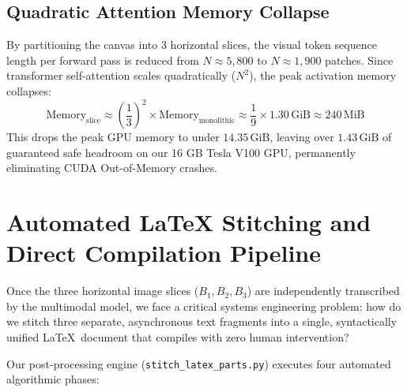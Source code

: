 \subsection{Quadratic Attention Memory Collapse}
By partitioning the canvas into 3 horizontal slices, the visual token sequence length per forward pass is reduced from $N \approx 5,800$ to $N \approx 1,900$ patches. Since transformer self-attention scales quadratically ($N^2$), the peak activation memory collapses:
\begin{equation}
\text{Memory}_{\text{slice}} \approx \left(\frac{1}{3}\right)^2 \times \text{Memory}_{\text{monolithic}} \approx \frac{1}{9} \times 1.30\,\text{GiB} \approx 240\,\text{MiB}
\end{equation}
This drops the peak GPU memory to under $14.35\,\text{GiB}$, leaving over $1.43\,\text{GiB}$ of guaranteed safe headroom on our 16 GB Tesla V100 GPU, permanently eliminating CUDA Out-of-Memory crashes.

\section{Automated LaTeX Stitching and Direct Compilation Pipeline}
\label{sec:latex_stitching_pipeline}

Once the three horizontal image slices ($B_1, B_2, B_3$) are independently transcribed by the multimodal model, we face a critical systems engineering problem: how do we stitch three separate, asynchronous text fragments into a single, syntactically unified \LaTeX\ document that compiles with zero human intervention?

Our post-processing engine (\texttt{stitch\_latex\_parts.py}) executes four automated algorithmic phases:

